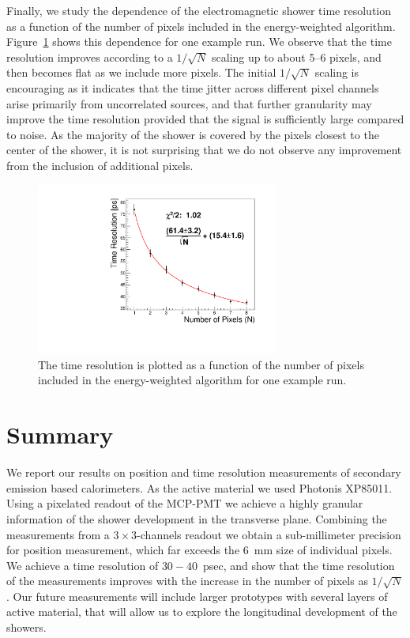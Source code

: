 \documentclass[12pt]{article}
\begin{document}
Finally, we study the dependence of the electromagnetic shower time resolution
as a function of the number of pixels included in the energy-weighted algorithm.
Figure~\ref{fig:sqrtN} shows this dependence for one example run. We observe
that the time resolution improves according to a $1/\sqrt{N}$ scaling up to
about 5--6 pixels, and then becomes flat as we include more pixels. The
initial $1/\sqrt{N}$ scaling is encouraging as it indicates that the time jitter across
different pixel channels arise primarily from uncorrelated sources, and that
further granularity may improve the time resolution provided that the signal is
sufficiently large compared to noise. As the majority of the shower is
covered by the pixels closest to the center of the shower, it is not surprising
that we do not observe any improvement from the inclusion of additional pixels.

\begin{figure}[htbp]
  \centering
  \includegraphics[width=8cm]{Images/sqrtN/t1065_run_38_Dt_IWP.pdf}
  \caption{ The time resolution is plotted as a function of the number of pixels
    included in the energy-weighted algorithm for one example run. }
  \label{fig:sqrtN}
\end{figure}

\section{Summary} 

We report our results on position and time resolution measurements of secondary
emission based calorimeters. As the active material we used Photonis XP85011.
Using a pixelated readout of the MCP-PMT we achieve a highly granular information of
the shower development in the transverse plane. Combining the measurements from
a $3\times3$-channels readout we obtain a sub-millimeter precision for position
measurement, which far exceeds the 6~mm size of individual pixels. We achieve a
time resolution of $30-40$~psec, and show that the time resolution of the
measurements improves with the increase in the number of pixels as $1/\sqrt{N}$.
Our future measurements will include larger prototypes with several layers of
active material, that will allow us to explore the longitudinal development of
the showers.
\end{document}
